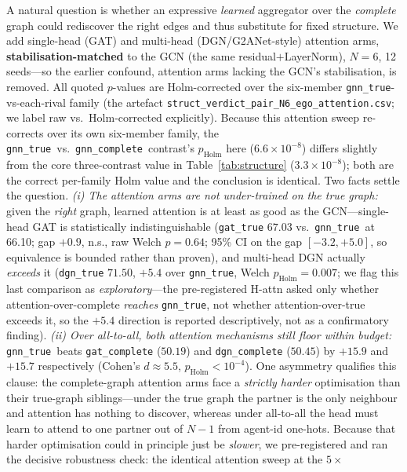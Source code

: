 \documentclass[10pt]{article}
\newcommand{\gtrue}{\texttt{gnn\_true}}
\newcommand{\gcomplete}{\texttt{gnn\_complete}}
\newcommand{\SCtrueN}{66.10}          %
\newcommand{\SCgatComplete}{50.19}    %
\newcommand{\SCdgnComplete}{50.45}    %
\newcommand{\SCgatTrue}{67.03}        %
\newcommand{\SCgatTrueGap}{+0.9}      %
\newcommand{\SCgatTrueP}{0.64}        %
\newcommand{\SCtrueGatCompGap}{+15.9} %
\newcommand{\SCtrueDgnCompGap}{+15.7} %
\newcommand{\SCtrueAttCompD}{5.5}     %
\begin{document}
A natural question is whether an expressive \emph{learned} aggregator over the
\emph{complete} graph could rediscover the right edges and thus substitute for
fixed structure. We add single-head (GAT) and multi-head (DGN/G2ANet-style)
attention arms, \textbf{stabilisation-matched} to the GCN (the same
residual$+$LayerNorm), $N{=}6$, 12 seeds---so the earlier confound, attention
arms lacking the GCN's stabilisation, is removed. All quoted $p$-values are
Holm-corrected over the six-member \gtrue-vs-each-rival family (the artefact
\texttt{struct\_verdict\_pair\_N6\_ego\_attention.csv}; we label raw vs.\
Holm-corrected explicitly). Because this attention sweep re-corrects over its
own six-member family, the \gtrue\ vs.\ \gcomplete\ contrast's $p_{\text{Holm}}$
here ($6.6\times10^{-8}$) differs slightly from the core three-contrast value in
Table~\ref{tab:structure} ($3.3\times10^{-8}$); both are the correct per-family
Holm value and the conclusion is identical. Two facts settle the
question. \emph{(i) The attention arms are not under-trained on the
true graph:} given the
\emph{right} graph, learned attention is at least as good as the GCN---single-head
GAT is statistically indistinguishable (\texttt{gat\_true} $\SCgatTrue$ vs.\
\gtrue\ at \SCtrueN; gap $\SCgatTrueGap$, n.s., raw Welch $p=\SCgatTrueP$;
95\% CI on the gap $[-3.2, +5.0]$, so equivalence is bounded rather than
proven), and
multi-head DGN actually \emph{exceeds} it (\texttt{dgn\_true} $71.50$, $+5.4$ over
\gtrue, Welch $p_{\text{Holm}}=0.007$; we flag this last comparison as
\emph{exploratory}---the pre-registered H-attn asked only whether
attention-over-complete \emph{reaches} \gtrue, not whether attention-over-true
exceeds it, so the $+5.4$ direction is reported descriptively, not as a
confirmatory finding). \emph{(ii) Over
all-to-all, both attention mechanisms still floor within budget:} \gtrue\ beats
\texttt{gat\_complete} ($\SCgatComplete$) and \texttt{dgn\_complete}
($\SCdgnComplete$) by $\SCtrueGatCompGap$ and $\SCtrueDgnCompGap$
respectively (Cohen's $d{\approx}\SCtrueAttCompD$, $p_{\text{Holm}}<10^{-4}$).
One asymmetry qualifies this clause: the complete-graph
attention arms face a \emph{strictly harder} optimisation than their true-graph
siblings---under the true graph the partner is the only neighbour and attention
has nothing to discover, whereas under all-to-all the head must learn to attend
to one partner out of $N{-}1$ from agent-id one-hots. Because that harder
optimisation could in principle just be \emph{slower}, we pre-registered and ran
the decisive robustness check: the identical attention sweep at the $5\times$
\end{document}
